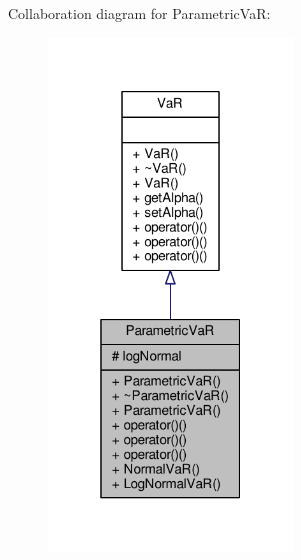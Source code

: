 Collaboration diagram for Parametric\+VaR\+:
\nopagebreak
\begin{figure}[H]
\begin{center}
\leavevmode
\includegraphics[width=184pt]{classParametricVaR__coll__graph}
\end{center}
\end{figure}
